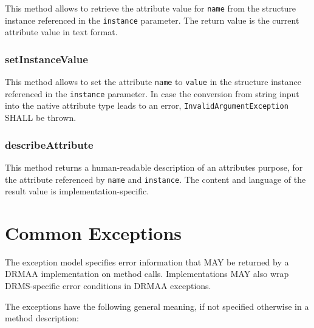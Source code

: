\documentclass{article}
\newcommand{\h}[1]{\lstinline|#1|}
\begin{document}
This method allows to retrieve the attribute value for \h{name} from the structure instance referenced in the \h{instance} parameter. The return value is the current attribute value in text format. 

\subsubsection{setInstanceValue}

This method allows to set the attribute \h{name} to \h{value} in the structure instance referenced in the \h{instance} parameter. In case the conversion from string input into the native attribute type leads to an error, \h{InvalidArgumentException} SHALL be thrown.

\subsubsection{describeAttribute}

This method returns a human-readable description of an attributes purpose, for the attribute referenced by \h{name} and \h{instance}. The content and language of the result value is implementation-specific.

\section{Common Exceptions}
\label{sec:exceptions}

The exception model specifies error information that MAY be returned by a DRMAA implementation on method calls. Implementations MAY also wrap DRMS-specific error conditions in DRMAA exceptions.



The exceptions have the following general meaning, if not specified otherwise in a method description:
\end{document}
